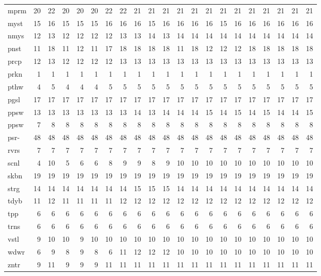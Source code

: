\begin{center}
\begin{tabular}{lrrrrrrrrrrrrrrrrrrrr}
mprm & 20 & 22 & 20 & 20 & 20 & 22 & 22 & 21 & 21 & 21 & 21 & 21 & 21 & 21 & 21 & 21 & 21 & 21 & 21 & 21\\
myst & 15 & 16 & 15 & 15 & 15 & 16 & 16 & 16 & 15 & 16 & 16 & 16 & 16 & 15 & 16 & 16 & 16 & 16 & 16 & 16\\
nmys & 12 & 13 & 12 & 12 & 12 & 12 & 13 & 13 & 14 & 13 & 14 & 14 & 14 & 14 & 14 & 14 & 14 & 14 & 14 & 14\\
pnst & 11 & 18 & 11 & 12 & 11 & 17 & 18 & 18 & 18 & 18 & 11 & 18 & 12 & 12 & 12 & 18 & 18 & 18 & 18 & 18\\
prcp & 12 & 13 & 12 & 12 & 12 & 12 & 13 & 13 & 13 & 13 & 13 & 13 & 13 & 13 & 13 & 13 & 13 & 13 & 13 & 13\\
prkn & 1 & 1 & 1 & 1 & 1 & 1 & 1 & 1 & 1 & 1 & 1 & 1 & 1 & 1 & 1 & 1 & 1 & 1 & 1 & 1\\
pthw & 4 & 5 & 4 & 4 & 4 & 5 & 5 & 5 & 5 & 5 & 5 & 5 & 5 & 5 & 5 & 5 & 5 & 5 & 5 & 5\\
pgsl & 17 & 17 & 17 & 17 & 17 & 17 & 17 & 17 & 17 & 17 & 17 & 17 & 17 & 17 & 17 & 17 & 17 & 17 & 17 & 17\\
ppsw & 13 & 13 & 13 & 13 & 13 & 13 & 13 & 14 & 13 & 14 & 14 & 14 & 15 & 14 & 15 & 14 & 15 & 14 & 14 & 15\\
ppsw & 7 & 8 & 8 & 8 & 8 & 8 & 8 & 8 & 8 & 8 & 8 & 8 & 8 & 8 & 8 & 8 & 8 & 8 & 8 & 8\\
psr- & 48 & 48 & 48 & 48 & 48 & 48 & 48 & 48 & 48 & 48 & 48 & 48 & 48 & 48 & 48 & 48 & 48 & 48 & 48 & 48\\
rvrs & 7 & 7 & 7 & 7 & 7 & 7 & 7 & 7 & 7 & 7 & 7 & 7 & 7 & 7 & 7 & 7 & 7 & 7 & 7 & 7\\
scnl & 4 & 10 & 5 & 6 & 6 & 8 & 9 & 9 & 8 & 9 & 10 & 10 & 10 & 10 & 10 & 10 & 10 & 10 & 10 & 10\\
skbn & 19 & 19 & 19 & 19 & 19 & 19 & 19 & 19 & 19 & 19 & 19 & 19 & 19 & 19 & 19 & 19 & 19 & 19 & 19 & 19\\
strg & 14 & 14 & 14 & 14 & 14 & 14 & 14 & 15 & 15 & 15 & 14 & 14 & 14 & 14 & 14 & 14 & 14 & 14 & 14 & 14\\
tdyb & 11 & 12 & 11 & 11 & 11 & 11 & 12 & 12 & 12 & 12 & 12 & 12 & 12 & 12 & 12 & 12 & 12 & 12 & 12 & 12\\
tpp & 6 & 6 & 6 & 6 & 6 & 6 & 6 & 6 & 6 & 6 & 6 & 6 & 6 & 6 & 6 & 6 & 6 & 6 & 6 & 6\\
trns & 6 & 6 & 6 & 6 & 6 & 6 & 6 & 6 & 6 & 6 & 6 & 6 & 6 & 6 & 6 & 6 & 6 & 6 & 6 & 6\\
vstl & 9 & 10 & 10 & 9 & 10 & 10 & 10 & 10 & 10 & 10 & 10 & 10 & 10 & 10 & 10 & 10 & 10 & 10 & 10 & 10\\
wdwr & 6 & 9 & 8 & 9 & 8 & 6 & 11 & 12 & 12 & 12 & 10 & 10 & 10 & 10 & 10 & 10 & 10 & 10 & 10 & 10\\
zntr & 9 & 11 & 9 & 9 & 9 & 11 & 11 & 11 & 11 & 11 & 11 & 11 & 11 & 11 & 11 & 11 & 11 & 11 & 11 & 11\\
\end{tabular}
\end{center}
